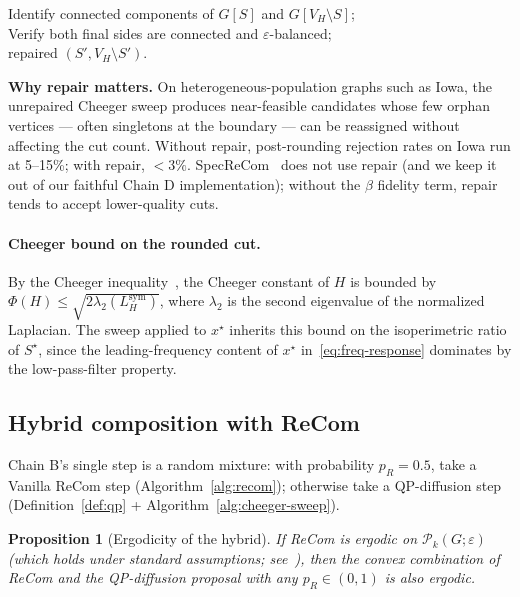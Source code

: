 \documentclass[11pt]{article}
\newtheorem{proposition}{Proposition}[section]
\begin{document}
\begin{algorithm}[H]
\caption{Orphan-flip repair}\label{alg:orphan-flip}
Identify connected components of $G[S]$ and $G[V_H \setminus S]$;\\
Verify both final sides are connected and $\varepsilon$-balanced;\\
\Return repaired $(S', V_H \setminus S')$.
\end{algorithm}

\textbf{Why repair matters.} On heterogeneous-population graphs such
as Iowa, the unrepaired Cheeger sweep produces near-feasible
candidates whose few orphan vertices --- often singletons at the
boundary --- can be reassigned without affecting the cut count.
Without repair, post-rounding rejection rates on Iowa run at 5--15\%;
with repair, $<3\%$. SpecReCom~\cite{davies2025spectral} does not use
repair (and we keep it out of our faithful Chain D
implementation); without the $\beta$ fidelity term, repair tends to
accept lower-quality cuts.

\paragraph{Cheeger bound on the rounded cut.} By the Cheeger
inequality~\cite{kelner2009spectral}, the Cheeger constant of $H$ is
bounded by $\Phi(H) \le \sqrt{2 \lambda_2(L_H^{\mathrm{sym}})}$, where
$\lambda_2$ is the second eigenvalue of the normalized Laplacian. The
sweep applied to $x^\star$ inherits this bound on the
isoperimetric ratio of $S^\star$, since the leading-frequency content
of $x^\star$ in~\eqref{eq:freq-response} dominates by the
low-pass-filter property.

\subsection{Hybrid composition with ReCom}\label{sec:hybrid-mh}

Chain B's single step is a random mixture: with probability
$p_R = 0.5$, take a Vanilla ReCom step (Algorithm~\ref{alg:recom});
otherwise take a QP-diffusion step (Definition~\ref{def:qp} +
Algorithm~\ref{alg:cheeger-sweep}).

\begin{proposition}[Ergodicity of the hybrid]\label{prop:ergodic}
If ReCom is ergodic on $\mathcal{P}_k(G; \varepsilon)$ (which holds
under standard assumptions; see~\cite{deford2021recombination,
cannon2024irreducibility}), then the convex combination of ReCom and
the QP-diffusion proposal with any $p_R \in (0, 1)$ is also ergodic.
\end{proposition}
\end{document}
